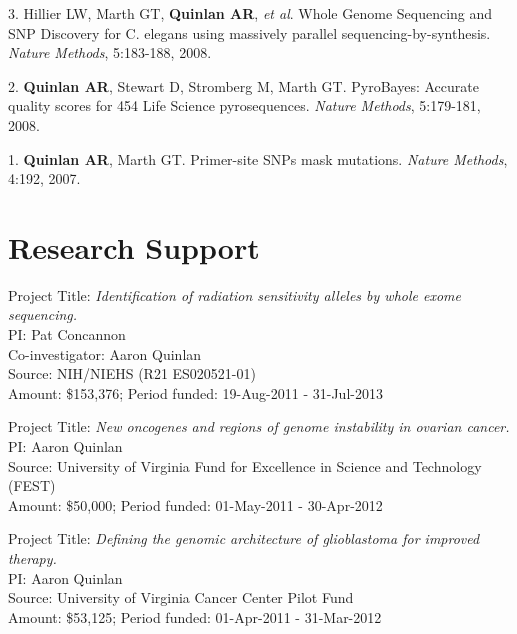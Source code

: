 \documentclass[margin,line]{cv}
\begin{document}
\begin{resume}
\begin{list}{*}{}
    \item[3.] Hillier LW, Marth GT, \textbf{Quinlan AR}, \textit{et al}. 
    Whole Genome Sequencing and SNP Discovery for C. elegans using massively parallel sequencing-by-synthesis. 
    \textit{Nature Methods}, 5:183-188, 2008.
    
    \item[2.] \textbf{Quinlan AR}, Stewart D, Stromberg M, Marth GT. 
    PyroBayes: Accurate quality scores for 454 Life Science pyrosequences.
    \textit{Nature Methods}, 5:179-181, 2008.
    
    \item[1.] \textbf{Quinlan AR}, Marth GT. 
    Primer-site SNPs mask mutations. 
    \textit{Nature Methods}, 4:192, 2007.

    \end{list}
    

    \section{\mysidestyle Research Support}
    
    Project Title: \textit{Identification of radiation sensitivity alleles by whole exome sequencing.} \\
    PI: Pat Concannon \\
    Co-investigator: Aaron Quinlan \\
    Source: NIH/NIEHS (R21 ES020521-01) \\
    Amount: \$153,376; Period funded: 19-Aug-2011 - 31-Jul-2013
    
    \vspace{-2mm}
    Project Title: \textit{New oncogenes and regions of genome instability in ovarian cancer.} \\
    PI: Aaron Quinlan \\
    Source: University of Virginia Fund for Excellence in Science and Technology (FEST) \\
    Amount: \$50,000; Period funded: 01-May-2011 - 30-Apr-2012
    
    \vspace{-2mm}
    Project Title: \textit{Defining the genomic architecture of glioblastoma for improved therapy.} \\
    PI: Aaron Quinlan \\
    Source: University of Virginia Cancer Center Pilot Fund\\
    Amount: \$53,125; Period funded: 01-Apr-2011 - 31-Mar-2012
    

\end{resume}
\end{document}
